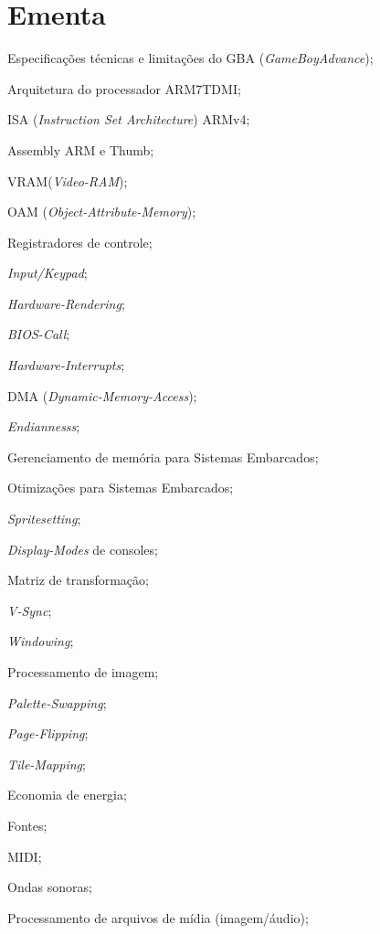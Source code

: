 \documentclass{article}
\begin{document}
\section{Ementa}
\begin{itemize*}[label={}]
    \item Especificações técnicas e limitações do GBA (\textit{GameBoyAdvance}); %
    \item Arquitetura do processador ARM7TDMI\@; %
    \item ISA (\textit{Instruction Set Architecture}) ARMv4; %
    \item Assembly ARM e Thumb; %
    \item VRAM\@ (\textit{Video-RAM}); %
    \item OAM (\textit{Object-Attribute-Memory}); %
    \item Registradores de controle; %
    \item \textit{Input/Keypad}; %
    \item \textit{Hardware-Rendering}; %
    \item \textit{BIOS-Call}; %
    \item \textit{Hardware-Interrupts}; %
    \item DMA (\textit{Dynamic-Memory-Access}); %
    \item \textit{Endiannesss}; %
    \item Gerenciamento de memória para Sistemas Embarcados; %
    \item Otimizações para Sistemas Embarcados; %
    \item \textit{Spritesetting}; %
    \item \textit{Display-Modes} de consoles; %
    \item Matriz de transformação; %
    \item \textit{V-Sync}; %
    \item \textit{Windowing}; %
    \item Processamento de imagem; %
    \item \textit{Palette-Swapping}; %
    \item \textit{Page-Flipping}; %
    \item \textit{Tile-Mapping}; %
    \item Economia de energia; %
    \item Fontes; %
    \item MIDI\@; %
    \item Ondas sonoras; %
    \item Processamento de arquivos de mídia (imagem/áudio); %
\end{itemize*}
\end{document}
